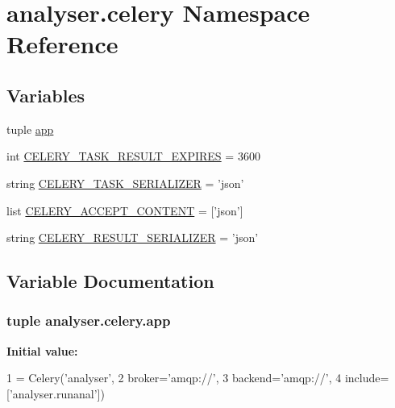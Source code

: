 \hypertarget{namespaceanalyser_1_1celery}{\section{analyser.\-celery Namespace Reference}
\label{namespaceanalyser_1_1celery}
}
\subsection*{Variables}
\begin{DoxyCompactItemize}
\item 
tuple \hyperlink{namespaceanalyser_1_1celery_abad0a5afdb9ca55f21bb1ed06efc2c0c}{app}
\item 
int \hyperlink{namespaceanalyser_1_1celery_ae2040d247e612c57e482ab06fbe9b552}{C\-E\-L\-E\-R\-Y\-\_\-\-T\-A\-S\-K\-\_\-\-R\-E\-S\-U\-L\-T\-\_\-\-E\-X\-P\-I\-R\-E\-S} = 3600
\item 
string \hyperlink{namespaceanalyser_1_1celery_ab91ed0525a64ceb5a617d27e73d0c3ca}{C\-E\-L\-E\-R\-Y\-\_\-\-T\-A\-S\-K\-\_\-\-S\-E\-R\-I\-A\-L\-I\-Z\-E\-R} = 'json'
\item 
list \hyperlink{namespaceanalyser_1_1celery_a31bcf5d5c6d3366754d90c930e04e686}{C\-E\-L\-E\-R\-Y\-\_\-\-A\-C\-C\-E\-P\-T\-\_\-\-C\-O\-N\-T\-E\-N\-T} = \mbox{[}'json'\mbox{]}
\item 
string \hyperlink{namespaceanalyser_1_1celery_a954b3de3c5e71e69b84e8851d717cc02}{C\-E\-L\-E\-R\-Y\-\_\-\-R\-E\-S\-U\-L\-T\-\_\-\-S\-E\-R\-I\-A\-L\-I\-Z\-E\-R} = 'json'
\end{DoxyCompactItemize}


\subsection{Variable Documentation}
\hypertarget{namespaceanalyser_1_1celery_abad0a5afdb9ca55f21bb1ed06efc2c0c}{
\subsubsection[{app}]{\setlength{\rightskip}{0pt plus 5cm}tuple analyser.\-celery.\-app}}\label{namespaceanalyser_1_1celery_abad0a5afdb9ca55f21bb1ed06efc2c0c}
{\bfseries Initial value\-:}
\begin{DoxyCode}
1 = Celery(\textcolor{stringliteral}{'analyser'},
2              broker=\textcolor{stringliteral}{'amqp://'},
3              backend=\textcolor{stringliteral}{'amqp://'},
4              include=[\textcolor{stringliteral}{'analyser.runanal'}])
\end{DoxyCode}


